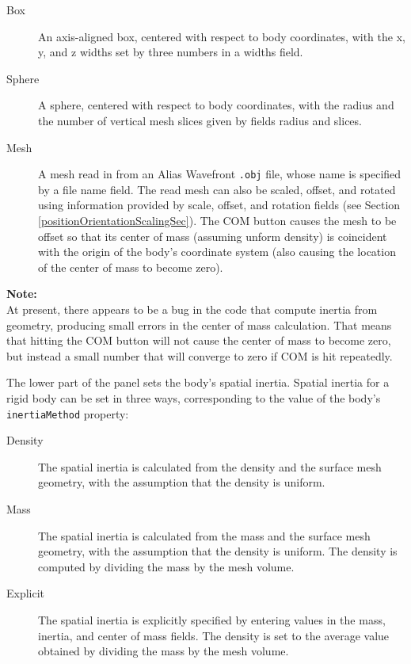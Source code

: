 \documentclass{article}
\begin{document}
\begin{description}

\item[Box]\mbox{}

An axis-aligned box, centered with respect to body coordinates, with
the x, y, and z widths set by three numbers in a {\sf widths} field.

\item[Sphere]\mbox{}

A sphere, centered with respect to body coordinates, with
the radius and the number of vertical mesh slices given
by fields {\sf radius} and {\sf slices}.

\item[Mesh]\mbox{}
 A mesh read in from an Alias Wavefront {\tt .obj} file, whose name
is specified by a {\sf file name} field. The read mesh can also be scaled,
offset, and rotated using information provided by {\sf scale}, {\sf offset},
and {\sf rotation} fields (see Section \ref{positionOrientationScalingSec}). The {\sf COM}
button causes the mesh to be offset so that its center of mass
(assuming unform density) is coincident with the origin of the body's
coordinate system (also causing the location of the center of mass to
become zero).

\end{description}

\begin{sideblock}
{\bf Note:}\\ 
At present, there appears to be a bug in the code that compute
inertia from geometry, producing small errors in the center of mass
calculation. That means that hitting the {\sf COM} button will not cause
the center of mass to become zero, but instead a small number that
will converge to zero if {\sf COM} is hit repeatedly.
\end{sideblock}

The lower part of the panel sets the body's spatial inertia.
Spatial inertia for a rigid body can be set in three ways,
corresponding to the value of the body's {\tt inertiaMethod} property:

\begin{description}

\item[Density]\mbox{}
 
The spatial inertia is calculated from the density and the surface
mesh geometry, with the assumption that the density is uniform.

\item[Mass]\mbox{}

The spatial inertia is calculated from the mass and the surface
mesh geometry, with the assumption that the density is uniform.
The density is computed by dividing the mass by the mesh volume.

\item[Explicit]\mbox{}

The spatial inertia is explicitly specified by entering
values in the mass, inertia, and center of mass fields. The density is
set to the average value obtained by dividing the mass by the
mesh volume.

\end{description}
\end{document}
